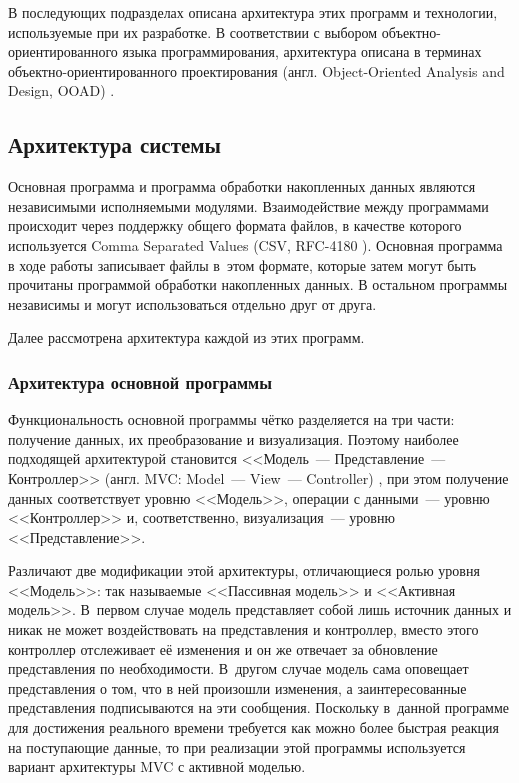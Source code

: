 \documentclass[a4paper, 14pt, titlepage]{extarticle}
\newcommand{\eng}[1]{\foreignlanguage{english}{#1}}
\begin{document}
  В последующих подразделах описана архитектура этих программ и технологии, используемые при их
  разработке. В соответствии с выбором объектно-ориентированного языка программирования, архитектура описана в
  терминах объектно-ориентированного проектирования (англ. \eng{Object-Oriented Analysis and Design,
  OOAD}) \cite{booch-ooad}.

  \subsection{Архитектура системы}

  Основная программа и программа обработки накопленных данных являются независимыми исполняемыми
  модулями. Взаимодействие между программами происходит через поддержку общего формата файлов, в
  качестве которого используется \eng{Comma Separated Values} (CSV, RFC-4180 \cite{rfc4180}).
  Основная программа в ходе работы записывает файлы в~этом формате, которые затем могут быть прочитаны
  программой обработки накопленных данных. В остальном программы независимы и могут использоваться
  отдельно друг от друга.

  Далее рассмотрена архитектура каждой из этих программ.

  \subsubsection{Архитектура основной программы}\label{sssec:main-arch}

  Функциональность основной программы чётко разделяется на три части: получение данных, их
  преобразование и визуализация. Поэтому наиболее подходящей архитектурой становится
  <<Модель~--- Представление~--- Контроллер>> (англ. \eng{MVC: Model~--- View~--- Controller})
  \cite{gamma-patterns}, при этом получение данных соответствует уровню <<Модель>>, операции с
  данными~--- уровню <<Контроллер>> и, соответственно, визуализация~--- уровню <<Представление>>.

  Различают две модификации этой архитектуры, отличающиеся ролью уровня <<Модель>>: так называемые
  <<Пассивная модель>> и <<Активная модель>>. В~первом случае модель представляет собой лишь
  источник данных и никак не может воздействовать на представления и контроллер, вместо этого
  контроллер отслеживает её изменения и он же отвечает за обновление представления по необходимости.
  В~другом случае модель сама оповещает представления о том, что в ней произошли изменения, а
  заинтересованные представления подписываются на эти сообщения. Поскольку в~данной программе для
  достижения реального времени требуется как можно более быстрая реакция на поступающие данные, то
  при реализации этой программы используется вариант архитектуры MVC с активной моделью.
\end{document}
